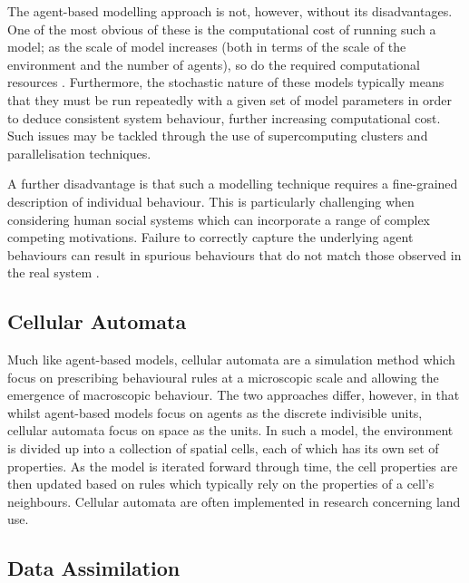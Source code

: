 The agent-based modelling approach is not, however, without its disadvantages.
One of the most obvious of these is the computational cost of running such a
model; as the scale of model increases (both in terms of the scale of the
environment and the number of agents), so do the required computational
resources \citep{bonabeau2002agent}.
Furthermore, the stochastic nature of these models typically means that they
must be run repeatedly with a given set of model parameters in order to deduce
consistent system behaviour, further increasing computational cost.
Such issues may be tackled through the use of supercomputing clusters and
parallelisation techniques.

A further disadvantage is that such a modelling technique requires a
fine-grained description of individual behaviour.
This is particularly challenging when considering human social systems which can
incorporate a range of complex competing motivations.
Failure to correctly capture the underlying agent behaviours can result in
spurious behaviours that do not match those observed in the real system
\citep{couclelis2002modeling}.

\subsection*{Cellular Automata}\label{sub:lit_rev:ca}

Much like agent-based models, cellular automata are a simulation method which
focus on prescribing behavioural rules at a microscopic scale and allowing the
emergence of macroscopic behaviour.
The two approaches differ, however, in that whilst agent-based models focus on
agents as the discrete indivisible units, cellular automata focus on space as
the units.
In such a model, the environment is divided up into a collection of spatial
cells, each of which has its own set of properties.
As the model is iterated forward through time, the cell properties are then
updated based on rules which typically rely on the properties of a cell's
neighbours.
Cellular automata are often implemented in research concerning land use.

\subsection{Data Assimilation}\label{sub:lit_rev:da}


